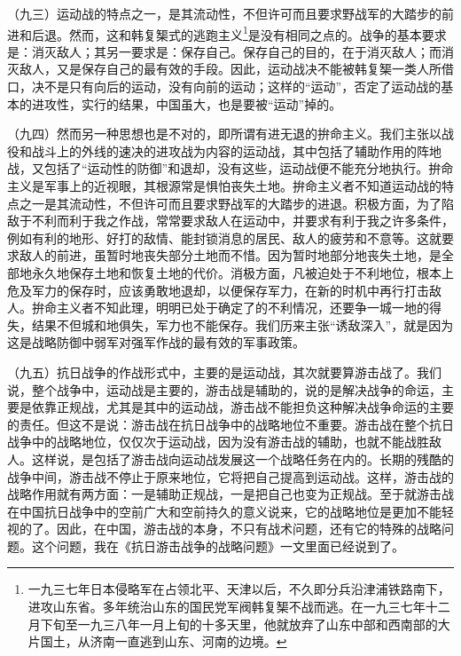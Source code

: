 \documentclass[UTF8, 12pt, a4paper]{ctexrep}
\begin{document}
（九三）运动战的特点之一，是其流动性，不但许可而且要求野战军的大踏步的前进和后退。然而，这和韩复榘式的逃跑主义\footnote{一九三七年日本侵略军在占领北平、天津以后，不久即分兵沿津浦铁路南下，进攻山东省。多年统治山东的国民党军阀韩复榘不战而逃。在一九三七年十二月下旬至一九三八年一月上旬的十多天里，他就放弃了山东中部和西南部的大片国土，从济南一直逃到山东、河南的边境。}是没有相同之点的。战争的基本要求是：消灭敌人；其另一要求是：保存自己。保存自己的目的，在于消灭敌人；而消灭敌人，又是保存自己的最有效的手段。因此，运动战决不能被韩复榘一类人所借口，决不是只有向后的运动，没有向前的运动；这样的“运动”，否定了运动战的基本的进攻性，实行的结果，中国虽大，也是要被“运动”掉的。

（九四）然而另一种思想也是不对的，即所谓有进无退的拚命主义。我们主张以战役和战斗上的外线的速决的进攻战为内容的运动战，其中包括了辅助作用的阵地战，又包括了“运动性的防御”和退却，没有这些，运动战便不能充分地执行。拚命主义是军事上的近视眼，其根源常是惧怕丧失土地。拚命主义者不知道运动战的特点之一是其流动性，不但许可而且要求野战军的大踏步的进退。积极方面，为了陷敌于不利而利于我之作战，常常要求敌人在运动中，并要求有利于我之许多条件，例如有利的地形、好打的敌情、能封锁消息的居民、敌人的疲劳和不意等。这就要求敌人的前进，虽暂时地丧失部分土地而不惜。因为暂时地部分地丧失土地，是全部地永久地保存土地和恢复土地的代价。消极方面，凡被迫处于不利地位，根本上危及军力的保存时，应该勇敢地退却，以便保存军力，在新的时机中再行打击敌人。拚命主义者不知此理，明明已处于确定了的不利情况，还要争一城一地的得失，结果不但城和地俱失，军力也不能保存。我们历来主张“诱敌深入”，就是因为这是战略防御中弱军对强军作战的最有效的军事政策。

（九五）抗日战争的作战形式中，主要的是运动战，其次就要算游击战了。我们说，整个战争中，运动战是主要的，游击战是辅助的，说的是解决战争的命运，主要是依靠正规战，尤其是其中的运动战，游击战不能担负这种解决战争命运的主要的责任。但这不是说：游击战在抗日战争中的战略地位不重要。游击战在整个抗日战争中的战略地位，仅仅次于运动战，因为没有游击战的辅助，也就不能战胜敌人。这样说，是包括了游击战向运动战发展这一个战略任务在内的。长期的残酷的战争中间，游击战不停止于原来地位，它将把自己提高到运动战。这样，游击战的战略作用就有两方面：一是辅助正规战，一是把自己也变为正规战。至于就游击战在中国抗日战争中的空前广大和空前持久的意义说来，它的战略地位是更加不能轻视的了。因此，在中国，游击战的本身，不只有战术问题，还有它的特殊的战略问题。这个问题，我在《抗日游击战争的战略问题》一文里面已经说到了。
\end{document}
